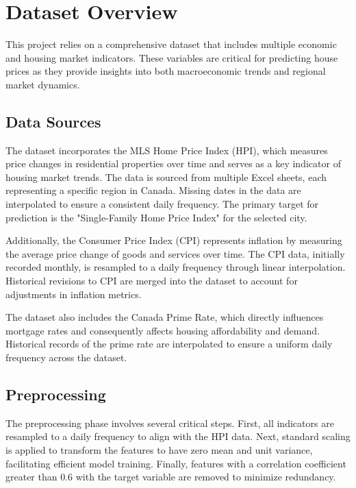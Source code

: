 \section{Dataset Overview}

This project relies on a comprehensive dataset that includes multiple economic and housing market indicators. These variables are critical for predicting house prices as they provide insights into both macroeconomic trends and regional market dynamics.

\subsection{Data Sources}

The dataset incorporates the MLS Home Price Index (HPI), which measures price changes in residential properties over time and serves as a key indicator of housing market trends. The data is sourced from multiple Excel sheets, each representing a specific region in Canada. Missing dates in the data are interpolated to ensure a consistent daily frequency. The primary target for prediction is the "Single-Family Home Price Index" for the selected city.

Additionally, the Consumer Price Index (CPI) represents inflation by measuring the average price change of goods and services over time. The CPI data, initially recorded monthly, is resampled to a daily frequency through linear interpolation. Historical revisions to CPI are merged into the dataset to account for adjustments in inflation metrics.

The dataset also includes the Canada Prime Rate, which directly influences mortgage rates and consequently affects housing affordability and demand. Historical records of the prime rate are interpolated to ensure a uniform daily frequency across the dataset.

\subsection{Preprocessing}

The preprocessing phase involves several critical steps. First, all indicators are resampled to a daily frequency to align with the HPI data. Next, standard scaling is applied to transform the features to have zero mean and unit variance, facilitating efficient model training. Finally, features with a correlation coefficient greater than 0.6 with the target variable are removed to minimize redundancy.

